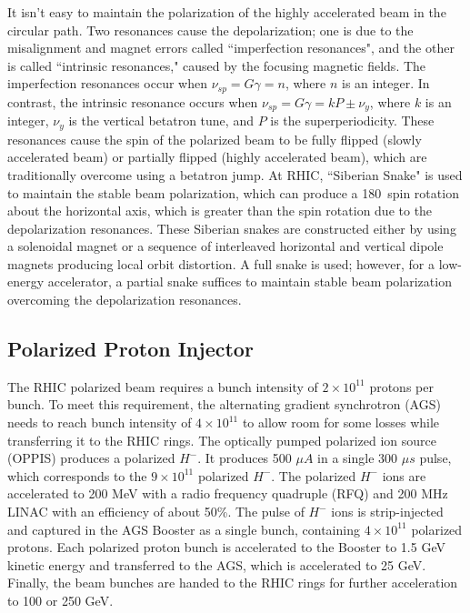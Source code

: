 It isn't easy to maintain the polarization of the highly accelerated beam in the circular path. Two resonances cause the depolarization; one is due to the misalignment and magnet errors called ``imperfection resonances", and the other is called ``intrinsic resonances," caused by the focusing magnetic fields. The imperfection resonances occur when $\nu_{sp}=G\gamma = n$, where $n$  is an integer. In contrast, the intrinsic resonance occurs when $\nu_{sp} = G\gamma = kP \pm \nu_y$, where $k$ is an integer, $\nu_y$ is the vertical betatron tune, and $P$ is the superperiodicity. These resonances cause the spin of the polarized beam to be fully flipped (slowly accelerated beam) or partially flipped (highly accelerated beam), which are traditionally overcome using a betatron jump. At RHIC, ``Siberian Snake" is used to maintain the stable beam polarization, which can produce a 180\textdegree \ spin rotation about the horizontal axis, which is greater than the spin rotation due to the depolarization resonances. These Siberian snakes are constructed either by using a solenoidal magnet or a sequence of interleaved horizontal and vertical dipole magnets producing local orbit distortion. A full snake is used; however, for a low-energy accelerator, a partial snake suffices to maintain stable beam polarization overcoming the depolarization resonances. 

\subsection{Polarized Proton Injector}
The RHIC polarized beam requires a bunch intensity of $2\times 10^{11}$ protons per bunch. To meet this requirement, the alternating gradient synchrotron (AGS) needs to reach bunch intensity of $4\times 10^{11}$ to allow room for some losses while transferring it to the RHIC rings. The optically pumped polarized ion source (OPPIS) produces a polarized $H^-$. It produces 500 $\mu A$ in a single  300 $\mu s$ pulse, which corresponds to the $9\times 10^{11}$ polarized $H^-$. The polarized $H^-$ ions are accelerated to 200 MeV with a radio frequency quadruple (RFQ) and 200 MHz LINAC with an efficiency of about 50\%. The pulse of $H^-$ ions is strip-injected and captured in the AGS Booster as a single bunch, containing $4\times 10^{11}$ polarized protons. Each polarized proton bunch is accelerated to the Booster to 1.5 GeV kinetic energy and transferred to the AGS, which is accelerated to 25 GeV. Finally, the beam bunches are handed to the RHIC rings for further acceleration to 100 or 250 GeV.     


